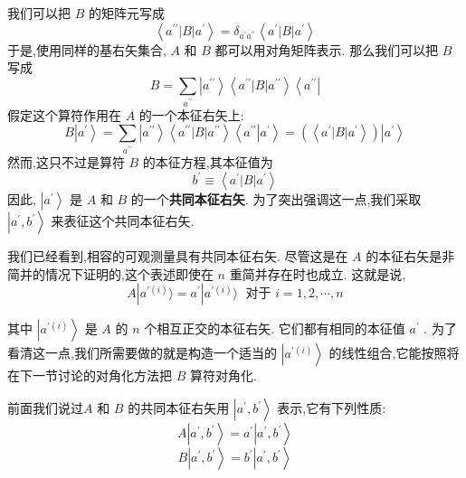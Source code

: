 	我们可以把 $B$ 的矩阵元写成
	\begin{equation}
		\left\langle {{a}^{\prime \prime }\left| B\right| {a}^{\prime }}\right\rangle = {\delta }_{{a}^{\prime }{a}^{\prime \prime }}\left\langle {{a}^{\prime }\left| B\right| {a}^{\prime }}\right\rangle
	\end{equation}
	于是,使用同样的基右矢集合, $A$ 和 $B$ 都可以用对角矩阵表示. 那么我们可以把 $B$ 写成
	\begin{equation}
		B = \mathop{\sum }\limits_{{a}^{\prime \prime }}\left| {a}^{\prime \prime }\right\rangle \left\langle {{a}^{\prime \prime }\left| B\right| {a}^{\prime \prime }}\right\rangle \left\langle {a}^{\prime \prime }\right|
	\end{equation}
	假定这个算符作用在 $A$ 的一个本征右矢上:
	\begin{equation}
		B\left| {a}^{\prime }\right\rangle = \mathop{\sum }\limits_{{a}^{\prime \prime }}\left| {a}^{\prime \prime }\right\rangle \left\langle {{a}^{\prime \prime }\left| B\right| {a}^{\prime \prime }}\right\rangle \left\langle {{a}^{\prime \prime }\left| {a}^{\prime }\right\rangle } = \left( \left\langle {{a}^{\prime }\left| B\right| {a}^{\prime }}\right\rangle \right) \left| {a}^{\prime }\right\rangle
	\end{equation}
	然而,这只不过是算符 $B$ 的本征方程,其本征值为
	\begin{equation}
		{b}^{\prime } \equiv \left\langle {{a}^{\prime }\left| B\right| {a}^{\prime }}\right\rangle
	\end{equation}
	因此, $\left| {a}^{\prime }\right\rangle$ 是 $A$ 和 $B$ 的一个\textbf{共同本征右矢}. 为了突出强调这一点,我们采取 $\left| {{a}^{\prime },{b}^{\prime }}\right\rangle$ 来表征这个共同本征右矢.
	
	我们已经看到,相容的可观测量具有共同本征右矢. 尽管这是在 $A$ 的本征右矢是非简并的情况下证明的,这个表述即使在 $n$ 重简并存在时也成立. 这就是说,
	\begin{equation}
		A| {a}^{\prime \left( i\right) }\rangle = {a}^{\prime }| {a}^{\prime \left( i\right) }\rangle \;\text{ 对于 }i = 1,2,\cdots, n
	\end{equation}
	
	其中 $\left| {a}^{\prime \left( i\right) }\right\rangle$ 是 $A$ 的 $n$ 个相互正交的本征右矢. 它们都有相同的本征值 ${a}^{\prime }$ . 为了看清这一点,我们所需要做的就是构造一个适当的 $\left| {a}^{\prime \left( i\right) }\right\rangle$ 的线性组合,它能按照将在下一节讨论的对角化方法把 $B$ 算符对角化.
	
	前面我们说过$A$ 和 $B$ 的共同本征右矢用 $\left| {{a}^{\prime },{b}^{\prime }}\right\rangle$ 表示,它有下列性质:
	\begin{equation}
		A\left| {{a}^{\prime },{b}^{\prime }}\right\rangle = {a}^{\prime }\left| {{a}^{\prime },{b}^{\prime }}\right\rangle
	\end{equation}
	\begin{equation}
		B\left| {{a}^{\prime },{b}^{\prime }}\right\rangle = {b}^{\prime }\left| {{a}^{\prime },{b}^{\prime }}\right\rangle
	\end{equation}
	
